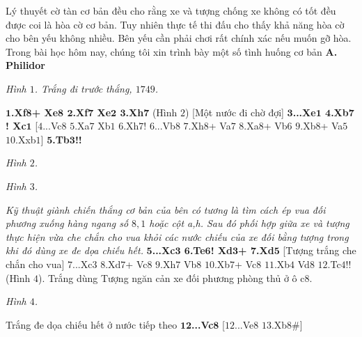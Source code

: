 \begin{multicols}{2}
	Lý thuyết cờ tàn cơ bản đều cho rằng xe và tượng chống xe không có tốt đều được coi là hòa cờ cơ bản. Tuy nhiên thực tế thi đấu cho thấy khả năng hòa cờ cho bên yếu không nhiều. Bên yếu cần phải chơi rất chính xác nếu muốn gỡ hòa.
	Trong bài học hôm nay, chúng tôi xin trình bày một số tình huống cơ bản 
	\vskip 0.1cm
	\textbf{\color{gocco}A.	Philidor}
	\begin{center}
		\newgame
		\scalebox{0.85}\showboard
		\vskip 0.1cm
		\textit{\small\color{gocco}Hình $1$. Trắng đi trước thắng, $1749$.}
	\end{center}
	\textbf{\color{gocco}$\pmb{1}$.Xf$\pmb{8}$+ Xe$\pmb{8}$ $\pmb{2}$.Xf$\pmb{7}$ Xe$\pmb{2}$ $\pmb{3}$.Xh$\pmb{7}$} (Hình $2$) [Một nước đi chờ đợi]
	\vskip 0.1cm
	\textbf{\color{gocco}$\pmb{3}$...Xe$\pmb{1}$ $\pmb{4}$.Xb$\pmb{7}$! Xc$\pmb{1}$} [$4$...Vc$8$ $5$.Xa$7$ Xb$1$ $6$.Xh$7$! 
	\vskip 0.1cm
	$6$...Vb$8$ $7$.Xh$8$+ Va$7$ $8$.Xa$8$+ Vb$6$ $9$.Xb$8$+ Va$5$ $10$.Xxb$1$]
	\vskip 0.1cm
	\textbf{\color{gocco}$\pmb{5}$.Tb$\pmb{3}$!!} 
	\begin{center}
		\newgame
		\scalebox{0.85}\showboard
		\vskip 0.1cm
		\textit{\small\color{gocco}Hình $2$.}
	\end{center}
	\begin{center}
		\newgame
		\scalebox{0.85}\showboard
		\vskip 0.1cm
		\textit{\small\color{gocco}Hình $3$.}
	\end{center}
	\textit{Kỹ thuật giành chiến thắng cơ bản của bên có tương là tìm cách ép vua đối phương xuống hàng ngang số $8,1$ hoặc cột a,h. Sau đó phối hợp giữa xe và tượng thực hiện vừa che chắn cho vua khỏi các nước chiếu của xe đối bằng tượng trong khi đó dùng xe đe dọa chiếu hết.}
	\vskip 0.1cm
	\textbf{\color{gocco}$\pmb{5}$...Xc$\pmb{3}$ $\pmb{6}$.Te$\pmb{6}$! Xd$\pmb{3}$+ $\pmb{7}$.Xd$\pmb{5}$} [Tượng trắng che chắn cho vua]
	\vskip 0.1cm
	$7$...Xc$3$ $8$.Xd$7$+ Vc$8$ $9$.Xh$7$ Vb$8$ $10$.Xb$7$+ Vc$8$ $11$.Xb$4$ Vd$8$ $12$.Tc$4$!! (Hình $4$). Trắng dùng Tượng ngăn cản xe đối phương phòng thủ ở ô c$8$.
	\begin{center}
		\newgame
		\scalebox{0.85}\showboard
		\vskip 0.1cm
		\textit{\small\color{gocco}Hình $4$.}
	\end{center}
	Trắng đe dọa chiếu hết ở nước tiếp theo
	\vskip 0.1cm
	\textbf{\color{gocco}$\pmb{12}$...Vc$\pmb{8}$} [$12$...Ve$8$ $13$.Xb$8\#$]

\end{multicols}
